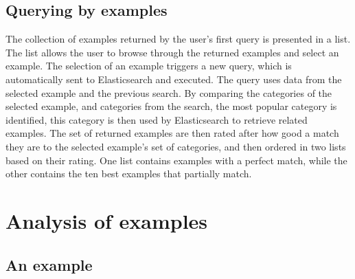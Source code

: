 \subsection{Querying by examples}
The collection of examples returned by the user's first query is presented in a list. The list allows the user to browse through the returned examples and select an example. The selection of an example triggers a new query, which is automatically sent to Elasticsearch and executed. The query uses data from the selected example and the previous search. By comparing the categories of the selected example, and categories from the search, the most popular category is identified, this category is then used by Elasticsearch to retrieve related examples. The set of returned examples are then rated after how good a match they are to the selected example's set of categories, and then ordered in two lists based on their rating. One list contains examples with a perfect match, while the other contains the ten best examples that partially match.


\section{Analysis of examples} \label{examples-section} %

\subsection{An example}

